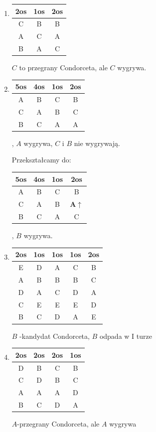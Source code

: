 \documentclass[12pt,a4paper]{article}
\theoremstyle{break}
\begin{document}
\begin{enumerate}[K1)]
			\item \begin{tabular}{|c|c|c|}\hline
				2os & 1os & 2os\\\hline
				C & B & B\\\hline
				A & C & A\\\hline
				B & A & C\\\hline
			\end{tabular} $C$ to przegrany Condorceta, ale $C$ wygrywa.
			
			\item \begin{tabular}{|c|c|c|c|}\hline
				5os & 4os & 1os & 2os\\\hline
				A & B & C & B\\\hline
				C & A & B & C\\\hline
				B & C & A & A\\\hline
			\end{tabular}, $A$ wygrywa, $C$ i $B$ nie wygrywają.
			
			Przekształcamy do: \begin{tabular}{|c|c|c|c|}\hline
				5os & 4os & 1os & 2os\\\hline
				A & B & C & B\\\hline
				C & A & B & \textbf{A$\uparrow$}\\\hline
				B & C & A & C\\\hline
			\end{tabular}, $B$ wygrywa.
			
			\item \begin{tabular}{|c|c|c|c|c|}\hline
				2os & 1os & 1os & 1os & 2os\\\hline
				E & D & A & C & B\\\hline
				A & B & B & B & C\\\hline
				D & A & C & D & A\\\hline
				C & E & E & E & D\\\hline
				B & C & D & A & E\\\hline
			\end{tabular}
			$B$ -kandydat Condorceta, $B$ odpada w I turze
			
			\item \begin{tabular}{|c|c|c|c|}\hline
				2os & 2os & 2os & 1os\\\hline
				D & B & C & B\\\hline
				C & D & B & C\\\hline
				A & A & A & D\\\hline
				B & C & D & A\\\hline
			\end{tabular} $A$-przegrany Condorceta, ale $A$ wygrywa
			 
		\end{enumerate}
		
\end{document}
